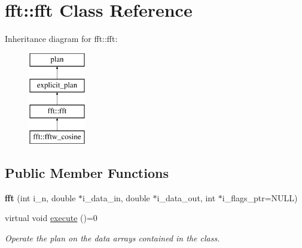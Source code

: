 \hypertarget{classfft_1_1fft}{\section{fft\-:\-:fft Class Reference}
\label{classfft_1_1fft}
}
Inheritance diagram for fft\-:\-:fft\-:\begin{figure}[H]
\begin{center}
\leavevmode
\includegraphics[height=4.000000cm]{classfft_1_1fft}
\end{center}
\end{figure}
\subsection*{Public Member Functions}
\begin{DoxyCompactItemize}
\item 
\hypertarget{classfft_1_1fft_a295c9acbead52b3af5037d9be04b82a8}{{\bfseries fft} (int i\-\_\-n, double $\ast$i\-\_\-data\-\_\-in, double $\ast$i\-\_\-data\-\_\-out, int $\ast$i\-\_\-flags\-\_\-ptr=N\-U\-L\-L)}\label{classfft_1_1fft_a295c9acbead52b3af5037d9be04b82a8}

\item 
virtual void \hyperlink{classfft_1_1fft_ac562cb93b9f0587991fc238d64754555}{execute} ()=0
\begin{DoxyCompactList}\small\item\em Operate the plan on the data arrays contained in the class. \end{DoxyCompactList}\end{DoxyCompactItemize}
